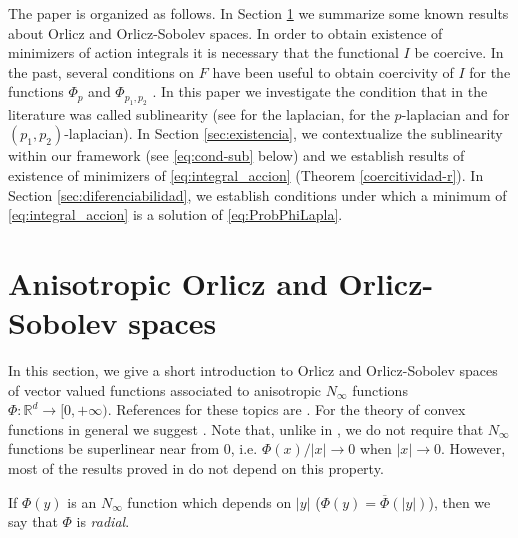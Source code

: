 \documentclass[twoside]{article}
\theoremstyle{remark}
\newcommand{\rr}{\mathbb{R}}
\begin{document}
The paper is organized as follows. In Section \ref{sec:preliminares}  we summarize some known results about Orlicz and Orlicz-Sobolev spaces. In order to obtain existence of minimizers of action integrals it is necessary that the functional $I$ be coercive. 
In the past, several conditions on $F$ have been useful to obtain coercivity of $I$ for the functions  $\Phi_p$ and $\Phi_{p_1,p_2}$ . 
In this paper  we investigate the condition that in the literature was called sublinearity 
(see \cite{tang1998periodic,wu1999periodic,zhao2004periodic} for the laplacian, \cite{li2015infinitely,tang2010periodic} for the $p$-laplacian and \cite{li2014periodic,pasca2010periodic,pacsca2010some,yang2013existence} for $(p_1,p_2)$-laplacian). In Section \ref{sec:existencia},  we contextualize the sublinearity within our framework (see \eqref{eq:cond-sub} below) and we  establish results of existence of minimizers of \eqref{eq:integral_accion} (Theorem \ref{coercitividad-r}).   In  Section \ref{sec:diferenciabilidad},  we establish conditions under which a minimum of \eqref{eq:integral_accion}  is a solution of \eqref{eq:ProbPhiLapla}.

   










\section{Anisotropic Orlicz and Orlicz-Sobolev spaces}\label{sec:preliminares}

In this section, we give a short introduction to  Orlicz and Orlicz-Sobolev spaces of vector valued functions associated to anisotropic $N_{\infty}$ functions $\Phi:\rr^d\to[0,+\infty)$.  References for  these topics are \cite{chamra2017anisotropic,cianchi2000fully,cianchi2004optimal,Desch2001,gwiazda2013anisotropic,Orliczvectorial2005,Skaff1969,trudinger1974imbedding}. For the theory of convex functions in general we suggest \cite{clarke2013functional}. 
Note that, unlike in \cite{gwiazda2013anisotropic}, we do not require that $N_{\infty}$ functions be superlinear near from 0, i.e. $\Phi(x)/|x|\to 0$ when $|x|\to 0$. However, most of the results proved in \cite{gwiazda2013anisotropic} do not depend on this property. 

If $\Phi(y)$ is an $N_{\infty}$  function which depends on $|y|$ ($\Phi(y)=\overline{\Phi}(|y|)$), then we say that $\Phi$ is \emph{radial}. 
\end{document}
